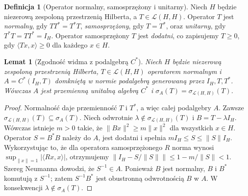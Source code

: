 \documentclass[11pt,a4paper]{article}
\numberwithin{equation}{section}
\theoremstyle{plain}
\newtheorem{lemat}[twierdzenie]{Lemat}
\theoremstyle{definition}
\newtheorem{definicja}[twierdzenie]{Definicja}
\theoremstyle{remark}
\begin{document}
\begin{definicja}[Operator normalny, samosprzężony i unitarny]
\label{def:normal32}
Niech $H$ będzie niezerową zespoloną przestrzenią Hilberta,
a $T\in\mathcal L(H,H)$. Operator $T$ jest \emph{normalny}, gdy
$TT^*=T^*T$, \emph{samosprzężony}, gdy $T=T^*$, oraz
\emph{unitarny}, gdy $T^*T=TT^*=I_H$. Operator samosprzężony
$T$ jest \emph{dodatni}, co zapisujemy $T\geq0$, gdy
$\langle Tx,x\rangle\geq0$ dla każdego $x\in H$.
\end{definicja}

\begin{lemat}[Zgodność widma z podalgebrą $C^*$]
\label{lem:spectral-permanence32}
Niech $H$ będzie niezerową zespoloną przestrzenią Hilberta,
$T\in\mathcal L(H,H)$ operatorem normalnym i
$A=C^*(I_H,T)$ domkniętą w normie podalgebrą generowaną
przez $I_H,T,T^*$. Wówczas $A$ jest przemienną unitalną
algebrą $C^*$ i $\sigma_A(T)=\sigma_{\mathcal L(H,H)}(T)$.
\end{lemat}
\begin{proof}
Normalność daje przemienność $T$ i $T^*$, a więc całej
podalgebry $A$. Zawsze $\sigma_{\mathcal L(H,H)}(T)\subseteq\sigma_A(T)$.
Niech odwrotnie $\lambda\notin\sigma_{\mathcal L(H,H)}(T)$ i
$B=T-\lambda I_H$. Wówczas istnieje $m>0$ takie, że
$\|Bx\|^2\geq m\|x\|^2$ dla wszystkich $x\in H$.
Operator $S=B^*B$ należy do $A$, jest dodatni i spełnia
$mI_H\leq S\leq\|S\|I_H$. Wykorzystując to, że dla operatora
samosprzężonego $R$ norma wynosi
$\sup_{\|x\|=1}|\langle Rx,x\rangle|$, otrzymujemy
$\|I_H-S/\|S\|\|\leq1-m/\|S\|<1$.
Szereg Neumanna dowodzi, że $S^{-1}\in A$. Ponieważ $B$ jest
normalny, $B$ i $B^*$ komutują z $S^{-1}$; zatem
$S^{-1}B^*$ jest obustronną odwrotnością $B$ w $A$.
W konsekwencji $\lambda\notin\sigma_A(T)$.
\end{proof}
\end{document}
